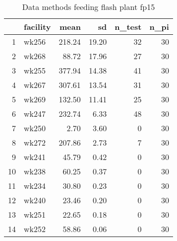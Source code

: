 \begin{table}[H]
\centering
\begin{tabular}{rlrrrr}
  \hline
 & facility & mean & sd & n\_test & n\_pi \\ 
  \hline
1 & wk256 & 218.24 & 19.20 &  32 &  30 \\ 
  2 & wk268 & 88.72 & 17.96 &  27 &  30 \\ 
  3 & wk255 & 377.94 & 14.38 &  41 &  30 \\ 
  4 & wk267 & 307.61 & 13.54 &  31 &  30 \\ 
  5 & wk269 & 132.50 & 11.41 &  25 &  30 \\ 
  6 & wk247 & 232.74 & 6.33 &  48 &  30 \\ 
  7 & wk250 & 2.70 & 3.60 &   0 &  30 \\ 
  8 & wk272 & 207.86 & 2.73 &   7 &  30 \\ 
  9 & wk241 & 45.79 & 0.42 &   0 &  30 \\ 
  10 & wk238 & 60.25 & 0.37 &   0 &  30 \\ 
  11 & wk234 & 30.80 & 0.23 &   0 &  30 \\ 
  12 & wk240 & 23.46 & 0.20 &   0 &  30 \\ 
  13 & wk251 & 22.65 & 0.18 &   0 &  30 \\ 
  14 & wk252 & 58.86 & 0.06 &   0 &  30 \\ 
   \hline
\end{tabular}
\caption{Data methods feeding flash plant fp15} 
\label{tab:well_summaries_fp15}
\end{table}
